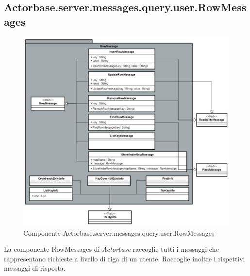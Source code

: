 \documentclass[a4paper]{article}
\begin{document}
	\subsection{Actorbase.server.messages.query.user.RowMessages}
		\begin{figure}[H]
			\centering
			\includegraphics[scale=0.4]{Server/RowMessagesLevel.jpg}
			\caption{Componente Actorbase.server.messages.query.user.RowMessages}
		\end{figure}
		La componente RowMessages di \emph{Actorbase} raccoglie tutti i messaggi che rappresentano richieste a livello di riga di un utente. Raccoglie inoltre i rispettivi messaggi di risposta.
		
\end{document}

